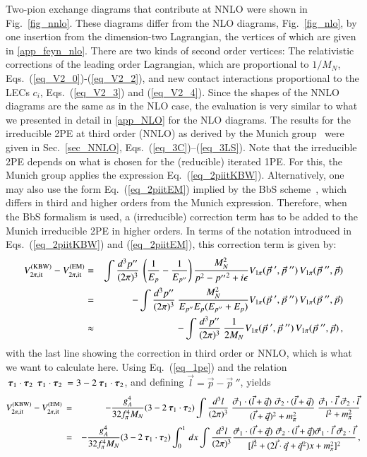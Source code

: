 \documentclass[sort&compress,preprint,3p]{elsarticle}
\newcommand{\bbox}[1]{\mbox{\boldmath $#1$}}
\begin{document}
Two-pion exchange diagrams that contribute at NNLO were shown in Fig.~\ref{fig_nnlo}.
These diagrams differ from the NLO diagrams, Fig.~\ref{fig_nlo}, by one insertion from
the dimension-two Lagrangian, the vertices of which are given in \ref{app_feyn_nlo}.
There are two kinds of second order vertices: The relativistic
corrections of the leading order Lagrangian, which are proportional to $1/M_N$, 
Eqs.~(\ref{eq_V2_0})-(\ref{eq_V2_2}), and new contact interactions proportional to the
LECs $c_i$, Eqs.~(\ref{eq_V2_3}) and (\ref{eq_V2_4}).
Since the shapes of the NNLO diagrams are the same as in the NLO case,
the evaluation is very similar to what we presented in detail in \ref{app_NLO}
for the NLO diagrams. 
The results for the irreducible 2PE at third order (NNLO) as derived by the Munich group~\cite{KBW97}
were given in Sec.~\ref{sec_NNLO}, Eqs.~(\ref{eq_3C})--(\ref{eq_3LS}).  
Note that the irreducible 2PE depends on what is chosen for the (reducible) iterated 1PE.
For this, the Munich group applies the expression Eq.~(\ref{eq_2piitKBW}).
Alternatively, one may also use the form Eq.~(\ref{eq_2piitEM}) implied by the 
BbS scheme~\cite{BS66}, which differs in third and higher orders from the Munich expression.
Therefore, when the BbS formalism is used, a (irreducible) correction term
has to be added to the Munich irreducible 2PE in higher orders. In terms of the notation introduced in
Eqs.~(\ref{eq_2piitKBW}) and (\ref{eq_2piitEM}), this correction term is given by: 
\begin{eqnarray}
V_{2\pi, \rm it}^{\rm(KBW)} - V_{2\pi, \rm it}^{\rm(EM)} 
&=&
\int \frac{d^3p''}{(2\pi)^3}\:
\left(\frac{1}{E_p}-\frac{1}{E_{p''}}\right)\frac{M_N^2}{p^2-{p''}^2+i\epsilon}
V_{1\pi} ({\vec p}~',{\vec p}~'')\,
V_{1\pi} ({\vec p}~'',{\vec p}) \\
&=&
-\int \frac{d^3p''}{(2\pi)^3}\:
\frac{M_N^2}{E_{p''}E_{p}(E_{p''}+E_{p})} 
V_{1\pi} ({\vec p}~',{\vec p}~'')\,
V_{1\pi} ({\vec p}~'',{\vec p}) \\
& \approx &
-\int \frac{d^3p''}{(2\pi)^3}\:
\frac{1}{2M_N}
V_{1\pi} ({\vec p}~',{\vec p}~'')\,
V_{1\pi} ({\vec p}~'',{\vec p}) \,,
\end{eqnarray}
with the last line showing the correction in third order or NNLO, which is what we want to calculate here.
Using Eq.~(\ref{eq_1pe}) and the relation $ \: \bbox{\tau}_1 \cdot \bbox{\tau}_2 \: 
\: \bbox{\tau}_1 \cdot \bbox{\tau}_2 \: =3-2 \: \bbox{\tau}_1 \cdot \bbox{\tau}_2$, and defining
$\vec l=\vec p-{\vec p}~''$, yields
\begin{eqnarray}
V_{2\pi, \rm it}^{\rm(KBW)} - V_{2\pi, \rm it}^{\rm(EM)}\, &=&
- \frac{g_A^4}{32 f_\pi^4 M_N}
(3-2 \: \bbox{\tau}_1 \cdot \bbox{\tau}_2 )
\int \frac{d^3 l}{(2 \pi)^3}
\;
\frac{\vec \sigma_1 \cdot (\vec l + \vec q) \,\, 
\vec \sigma_2 \cdot (\vec l + \vec q)}{(\vec l + \vec q)^2 +m_\pi^2}
\;
\frac{ \vec \sigma_1 \cdot \vec l \,\, 
\vec \sigma_2 \cdot \vec l }{l^2 +m_\pi^2} \\
&=&
- \frac{g_A^4}{32 f_\pi^4 M_N}
(3-2 \: \bbox{\tau}_1 \cdot \bbox{\tau}_2)
\int _0^1\,dx \int \frac{d^3 l}{(2 \pi)^3}
\frac{\vec \sigma_1 \cdot (\vec l + \vec q) \,\, 
\vec \sigma_2 \cdot (\vec l + \vec q)
\vec \sigma_1 \cdot \vec l \,\, \vec \sigma_2 \cdot \vec l }
{[\vec l^2 +(2\vec l \cdot \vec q+\vec q^2)x +m_\pi^2]^2} \,,
\end{eqnarray}
\end{document}
